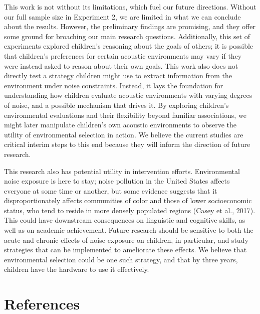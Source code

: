 \documentclass[10pt, letterpaper]{article}
\begin{document}
This work is not without its limitations, which fuel our future
directions. Without our full sample size in Experiment 2, we are limited
in what we can conclude about the results. However, the preliminary
findings are promising, and they offer some ground for broaching our
main research questions. Additionally, this set of experiments explored
children's reasoning about the goals of others; it is possible that
children's preferences for certain acoustic environments may vary if
they were instead asked to reason about their own goals. This work also
does not directly test a strategy children might use to extract
information from the environment under noise constraints. Instead, it
lays the foundation for understanding how children evaluate acoustic
environments with varying degrees of noise, and a possible mechanism
that drives it. By exploring children's environmental evaluations and
their flexibility beyond familiar associations, we might later
manipulate children's own acoustic environments to observe the utility
of environmental selection in action. We believe the current studies are
critical interim steps to this end because they will inform the
direction of future research.

This research also has potential utility in intervention efforts.
Environmental noise exposure is here to stay; noise pollution in the
United States affects everyone at some time or another, but some
evidence suggests that it disproportionately affects communities of
color and those of lower socioeconomic status, who tend to reside in
more densely populated regions (Casey et al., 2017). This could have
downstream consequences on linguistic and cognitive skills, as well as
on academic achievement. Future research should be sensitive to both the
acute and chronic effects of noise exposure on children, in particular,
and study strategies that can be implemented to ameliorate these
effects. We believe that environmental selection could be one such
strategy, and that by three years, children have the hardware to use it
effectively.

\hypertarget{references}{%
\section{References}\label{references}}

\setlength{\parindent}{-0.1in} 
\setlength{\leftskip}{0.125in}

\noindent
\end{document}

